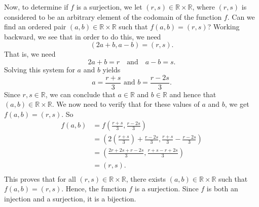 Now, to determine if  $f$  is a surjection, we let  
$( {r, s} ) \in \mathbb{R} \times \mathbb{R}$, where  $( {r, s} )$ is considered to be an arbitrary element of the codomain of the function  $f$.  Can we find an ordered pair $( {a, b} ) \in \mathbb{R} \times \mathbb{R}$ such that  $f( {a, b} ) = ( {r, s} )$?  Working backward, we see that in order to do this, we need
\[
( {2a + b, a - b} ) = ( {r, s} ).
\]
That is, we need
\[
  2a + b = r \quad \text{and} \quad    a - b = s. 
\]
Solving this system for  $a$  and  $b$  yields  
\[
a = \frac{{r + s}}{3} \text{ and } b = \frac{{r - 2s}}{3}.
\]
Since  $r, s \in \mathbb{R}$, we can conclude that  $a \in \mathbb{R}$ and 
$b \in \mathbb{R}$ and hence that  
\mbox{$( {a, b} ) \in \mathbb{R} \times \mathbb{R}$}.  We now need to verify that for these values of  $a$  and  $b$, we get  
$f( {a, b} ) = ( {r, s} )$.  So
\[
\begin{aligned}
  f( {a, b} ) &= f\!\left( {\frac{{r + s}}{3}, \frac{{r - 2s}}{3}} \right) \\ 
                         &= \left( {2\left( {\frac{{r + s}}{3}} \right) + \frac{{r - 2s}}{3},                             \frac{{r + s}}{3} - \frac{{r - 2s}}{3}} \right) \\ 
                         &= \left( {\frac{{2r + 2s + r - 2s}}{3}, \frac{{r + s - r + 2s}}{3}}                             \right) \\ 
                         &= ( {r, s} ). \\ 
\end{aligned} 
\]
This proves that for all  $( {r, s} ) \in \mathbb{R} \times \mathbb{R}$, there exists  $( {a, b} ) \in \mathbb{R} \times \mathbb{R}$ such that  
$f( {a, b} ) = ( {r, s} )$.  Hence, the function  $f$  is a surjection.  Since  $f$  is both an injection and a surjection,  it is a bijection.
\hbreak

